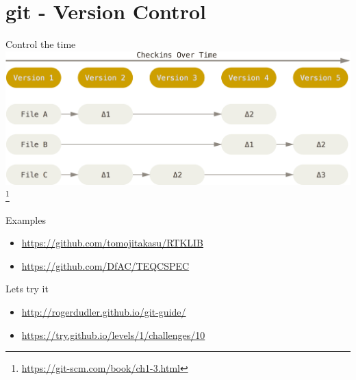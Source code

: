 \documentclass[11pt]{beamer}
\begin{document}
\section{git - Version Control}

\begin{frame}{Control the time}%
	\centering
	\includegraphics[width=\textwidth]{pic/git01.png}\footnote{\url{https://git-scm.com/book/ch1-3.html}}
\end{frame}


\begin{frame}{Examples}%

	\begin{itemize}
		\item \url{https://github.com/tomojitakasu/RTKLIB}
		\item \url{https://github.com/DfAC/TEQCSPEC}
	\end{itemize}

\end{frame}

\begin{frame}{Lets try it}%

	\begin{itemize}
		\item \url{http://rogerdudler.github.io/git-guide/}
		\item \url{https://try.github.io/levels/1/challenges/10}
	\end{itemize}

\end{frame}


\end{document}

